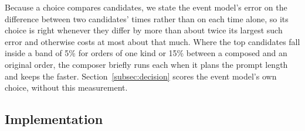 Because a choice compares candidates, we state the event model's error on the difference between two candidates' times rather than on each time alone, so its choice is right whenever they differ by more than about twice its largest such error and otherwise costs at most about that much.
Where the top candidates fall inside a band of 5\% for orders of one kind or 15\% between a composed and an original order, the composer briefly runs each when it plans the prompt length and keeps the faster.
Section~\ref{subsec:decision} scores the event model's own choice, without this measurement.

\subsection{Implementation}
\label{subsec:impl}

